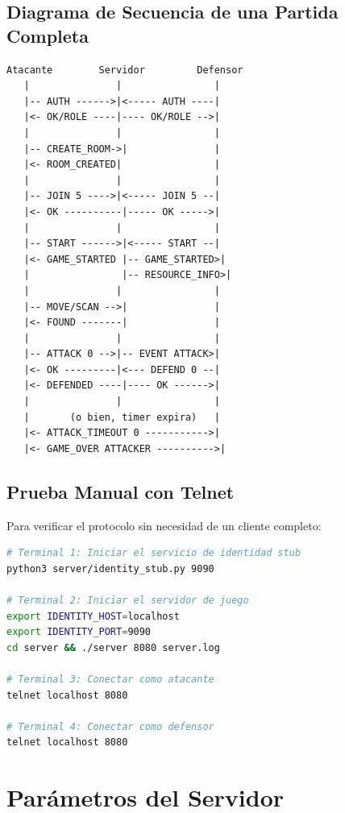 \documentclass[12pt, letterpaper]{article}
\begin{document}
\subsection{Diagrama de Secuencia de una Partida Completa}

\begin{lstlisting}
Atacante        Servidor         Defensor
   |               |                |
   |-- AUTH ------>|<----- AUTH ----|
   |<- OK/ROLE ----|---- OK/ROLE -->|
   |               |                |
   |-- CREATE_ROOM->|               |
   |<- ROOM_CREATED|                |
   |               |                |
   |-- JOIN 5 ---->|<----- JOIN 5 --|
   |<- OK ----------|----- OK ----->|
   |               |                |
   |-- START ------>|<----- START --|
   |<- GAME_STARTED |-- GAME_STARTED>|
   |                |-- RESOURCE_INFO>|
   |               |                |
   |-- MOVE/SCAN -->|               |
   |<- FOUND -------|               |
   |               |                |
   |-- ATTACK 0 -->|-- EVENT ATTACK>|
   |<- OK ---------|<--- DEFEND 0 --|
   |<- DEFENDED ----|---- OK ------>|
   |               |                |
   |       (o bien, timer expira)   |
   |<- ATTACK_TIMEOUT 0 ----------->|
   |<- GAME_OVER ATTACKER ---------->|
\end{lstlisting}

\subsection{Prueba Manual con Telnet}

Para verificar el protocolo sin necesidad de un cliente completo:

\begin{lstlisting}[language=bash]
# Terminal 1: Iniciar el servicio de identidad stub
python3 server/identity_stub.py 9090

# Terminal 2: Iniciar el servidor de juego
export IDENTITY_HOST=localhost
export IDENTITY_PORT=9090
cd server && ./server 8080 server.log

# Terminal 3: Conectar como atacante
telnet localhost 8080

# Terminal 4: Conectar como defensor
telnet localhost 8080
\end{lstlisting}

\section{Parámetros del Servidor}
\end{document}
